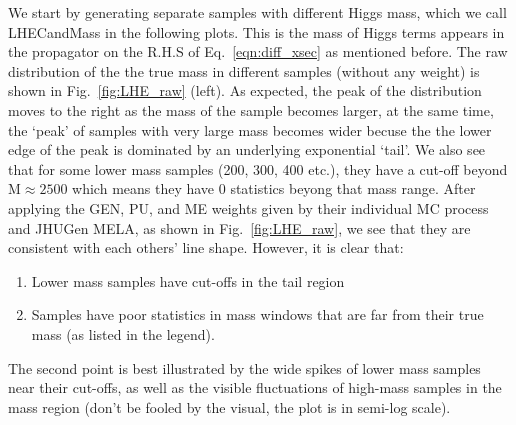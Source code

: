 We start by generating separate samples with different Higgs mass, which we call LHECandMass in the
following plots. This is the mass of Higgs terms appears in the propagator on 
the R.H.S of Eq.~\ref{eqn:diff_xsec} as mentioned before. The raw distribution of the the true mass
in different samples (without any weight) is shown in Fig.~\ref{fig:LHE_raw} (left). As expected, 
the peak of the distribution moves to the right as the mass of the sample becomes larger, at the
same time, the `peak' of samples with very large mass becomes wider becuse the the lower edge
of the peak is dominated by an underlying exponential `tail'. We also see that for some lower mass
samples (200, 300, 400 etc.), they have a cut-off beyond $\mathrm{M}\approx2500$ which means they have 0
statistics beyong that mass range. After applying the GEN, PU, and ME weights given by their
individual MC process and JHUGen MELA, as shown in Fig.~\ref{fig:LHE_raw},
we see that they are consistent with each others' line shape. However, it is clear
that:
\begin{enumerate}[label=(\roman*)]
  \item Lower mass samples have cut-offs in the tail region
  \item Samples have poor statistics in mass windows that are 
      far from their true mass (as listed in the legend).
\end{enumerate}
The second point is best illustrated by the wide spikes of lower mass samples near their cut-offs,
as well as the visible fluctuations of high-mass samples in the mass region (don't be fooled by the 
visual, the plot is in semi-log scale).
